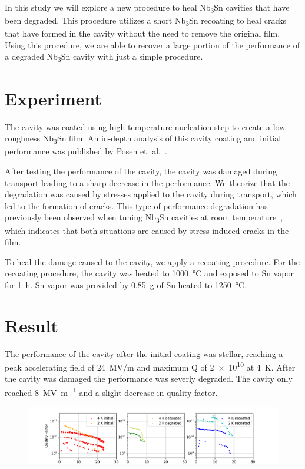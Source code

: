 \documentclass[]{revtex4-2}
\begin{document}
In this study we will explore a new procedure to heal Nb\textsubscript{3}Sn cavities that have been degraded. This procedure utilizes a short Nb\textsubscript{3}Sn recoating to heal cracks that have formed in the cavity without the need to remove the original film. Using this procedure, we are able to recover a large portion of the performance of a degraded Nb\textsubscript{3}Sn cavity with just a simple procedure.

\section{Experiment}
\label{sec:Experiment}

The cavity was coated using high-temperature nucleation step to create a low roughness Nb\textsubscript{3}Sn film. An in-depth analysis of this cavity coating and initial performance was published by Posen et. al.~\cite{posen2021advances}. 

After testing the performance of the cavity, the cavity was damaged during transport leading to a sharp decrease in the performance. We theorize that the degradation was caused by stresses applied to the cavity during transport, which led to the formation of cracks. This type of performance degradation has previously been observed when tuning Nb\textsubscript{3}Sn cavities at room temperature~\cite{eremeev:srf2019-mop015}, which indicates that both situations are caused by stress induced cracks in the film.

To heal the damage caused to the cavity, we apply a recoating procedure. For the recoating procedure, the cavity was heated to \qty{1000}{\degreeCelsius} and exposed to Sn vapor for \qty{1}{\hour}. Sn vapor was provided by \qty{0.85}{\gram} of Sn heated to \qty{1250}{\degreeCelsius}.

\section{Result}
\label{sec:Results}

The performance of the cavity after the initial coating was stellar, reaching a peak accelerating field of 24~MV/m and maximum Q of \num{2e10} at \qty{4}{\kelvin}. After the cavity was damaged the performance was severly degraded. The cavity only reached \qty{8}{\mega\volt\per\meter} and a slight decrease in quality factor.

\begin{figure}[h!]%
    \centering%
    \includegraphics[width=1.0\columnwidth]{./figures/VTS.png}%
    \caption{}%
    \label{fig:VTS}%
\end{figure}
\end{document}
